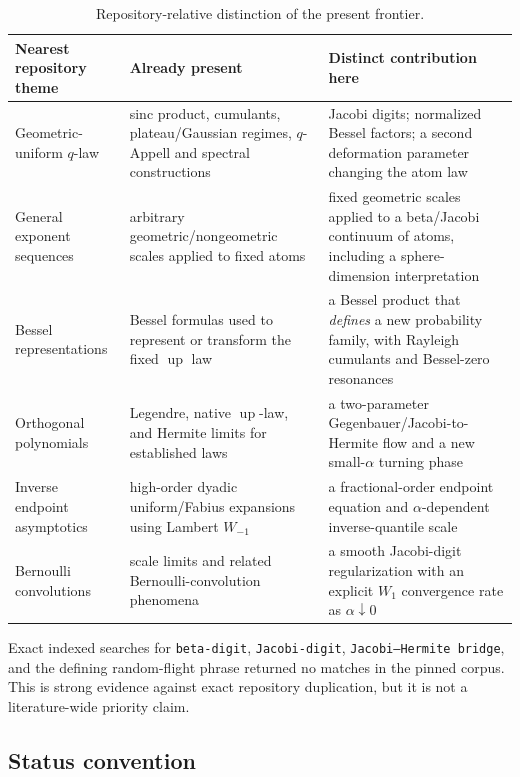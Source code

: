 \documentclass[11pt]{article}
\theoremstyle{definition}
\theoremstyle{remark}
\newcommand{\upf}{\operatorname{up}}
\begin{document}
\begin{table}[H]
\centering
\small
\begin{tabularx}{\textwidth}{@{}p{}X X@{}}
\toprule
Nearest repository theme & Already present & Distinct contribution here \\
\midrule
Geometric-uniform \(q\)-law
& sinc product, cumulants, plateau/Gaussian regimes, \(q\)-Appell and spectral constructions
& Jacobi digits; normalized Bessel factors; a second deformation parameter changing the atom law \\
\addlinespace
General exponent sequences
& arbitrary geometric/nongeometric scales applied to fixed atoms
& fixed geometric scales applied to a beta/Jacobi continuum of atoms, including a sphere-dimension interpretation \\
\addlinespace
Bessel representations
& Bessel formulas used to represent or transform the fixed \(\upf\) law
& a Bessel product that \emph{defines} a new probability family, with Rayleigh cumulants and Bessel-zero resonances \\
\addlinespace
Orthogonal polynomials
& Legendre, native \(\upf\)-law, and Hermite limits for established laws
& a two-parameter Gegenbauer/Jacobi-to-Hermite flow and a new small-\(\alpha\) turning phase \\
\addlinespace
Inverse endpoint asymptotics
& high-order dyadic uniform/Fabius expansions using Lambert \(W_{-1}\)
& a fractional-order endpoint equation and \(\alpha\)-dependent inverse-quantile scale \\
\addlinespace
Bernoulli convolutions
& scale limits and related Bernoulli-convolution phenomena
& a smooth Jacobi-digit regularization with an explicit \(W_1\) convergence rate as \(\alpha\downarrow0\) \\
\bottomrule
\end{tabularx}
\caption{Repository-relative distinction of the present frontier.}
\label{tab:crosswalk}
\end{table}

Exact indexed searches for \texttt{beta-digit}, \texttt{Jacobi-digit},
\texttt{Jacobi--Hermite bridge}, and the defining random-flight phrase returned
no matches in the pinned corpus.  This is strong evidence against exact
repository duplication, but it is not a literature-wide priority claim.

\subsection{Status convention}
\end{document}
